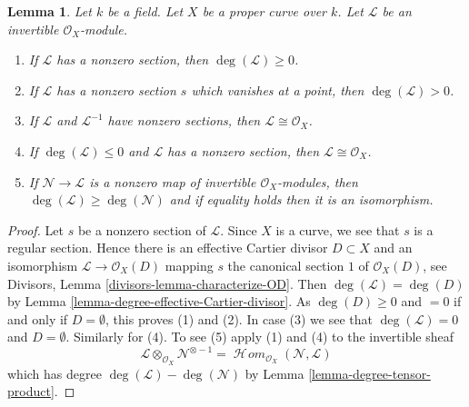 \documentclass[10pt,a4paper]{amsart}
\theoremstyle{plain}
\newtheorem{lemma}[subsection]{Lemma}
\theoremstyle{definition}
\theoremstyle{remark}
\numberwithin{equation}{subsection}
\def\SheafHom{\mathop{\mathcal{H}\!\mathit{om}}\nolimits}
\begin{document}
\begin{lemma}
\label{lemma-check-invertible-sheaf-trivial}
Let $k$ be a field. Let $X$ be a proper curve over $k$.
Let $\mathcal{L}$ be an invertible $\mathcal{O}_X$-module.
\begin{enumerate}
\item If $\mathcal{L}$ has a nonzero section, then
$\deg(\mathcal{L}) \geq 0$.
\item If $\mathcal{L}$ has a nonzero section $s$ which vanishes
at a point, then $\deg(\mathcal{L}) > 0$.
\item If $\mathcal{L}$ and $\mathcal{L}^{-1}$ have nonzero sections, then
$\mathcal{L} \cong \mathcal{O}_X$.
\item If $\deg(\mathcal{L}) \leq 0$ and $\mathcal{L}$ has a nonzero
section, then $\mathcal{L} \cong \mathcal{O}_X$.
\item If $\mathcal{N} \to \mathcal{L}$ is a nonzero map of invertible
$\mathcal{O}_X$-modules, then $\deg(\mathcal{L}) \geq \deg(\mathcal{N})$
and if equality holds then it is an isomorphism.
\end{enumerate}
\end{lemma}

\begin{proof}
Let $s$ be a nonzero section of $\mathcal{L}$. Since $X$ is a curve, we
see that $s$ is a regular section. Hence there is an effective
Cartier divisor $D \subset X$ and an isomorphism
$\mathcal{L} \to \mathcal{O}_X(D)$ mapping $s$ the canonical
section $1$ of $\mathcal{O}_X(D)$, see
Divisors, Lemma \ref{divisors-lemma-characterize-OD}.
Then $\deg(\mathcal{L}) = \deg(D)$ by
Lemma \ref{lemma-degree-effective-Cartier-divisor}.
As $\deg(D) \geq 0$ and $= 0$
if and only if $D = \emptyset$, this proves (1) and (2).
In case (3) we see that $\deg(\mathcal{L}) = 0$ and
$D = \emptyset$. Similarly for (4). To see (5) apply
(1) and (4) to the invertible sheaf
$$
\mathcal{L} \otimes_{\mathcal{O}_X} \mathcal{N}^{\otimes -1} =
\SheafHom_{\mathcal{O}_X}(\mathcal{N}, \mathcal{L})
$$
which has degree $\deg(\mathcal{L}) - \deg(\mathcal{N})$
by Lemma \ref{lemma-degree-tensor-product}.
\end{proof}
\end{document}
